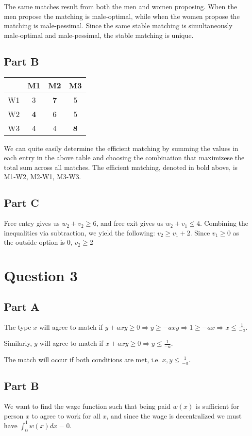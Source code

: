 \documentclass[11pt]{article} %
\begin{document}
The same matches result from both the men and women proposing. When the men propose the matching is male-optimal, while when the women propose the matching is male-pessimal. Since the same stable matching is simultaneously male-optimal and male-pessimal, the stable matching is unique.

\subsection{Part B}
\begin{center}
\begin{tabular}{c|ccc}
 & M1 & M2 & M3\\
\hline
W1 & 3 & \textbf{7} & 5 \\
W2 & \textbf{4} & 6 & 5 \\
W3 & 4 & 4 & \textbf{8}
\end{tabular}
\end{center}
We can quite easily determine the efficient matching by summing the values in each entry in the above table and choosing the combination that maximizese the total sum across all matches. The efficient matching, denoted in bold above, is M1-W2, M2-W1, M3-W3.

\subsection{Part C}
Free entry gives us $w_2+v_2 \geq 6$, and free exit gives us $w_2 + v_1 \leq 4$. Combining the inequalities via subtraction, we yield the following: $v_2 \geq v_1 + 2$. Since $v_1\geq 0 $ as the outside option is $0$, $v_2 \geq 2$

\section{Question 3}
\subsection{Part A}
The type $x$ will agree to match if $y+axy\geq0 \Rightarrow y\geq -axy \Rightarrow 1\geq -ax \Rightarrow x\leq \frac{1}{-a}$.

Similarly, $y$ will agree to match if $x+axy \geq 0 \Rightarrow y\leq \frac{1}{-a}$.

The match will occur if both conditions are met, i.e. $x,y\leq \frac{1}{-a}.$

\subsection{Part B}
We want to find the wage function such that being paid $w(x)$ is sufficient for person $x$ to agree to work for all $x$, and since the wage is decentralized we must have $\int_{0}^1w(x)dx = 0.$  
\end{document}
